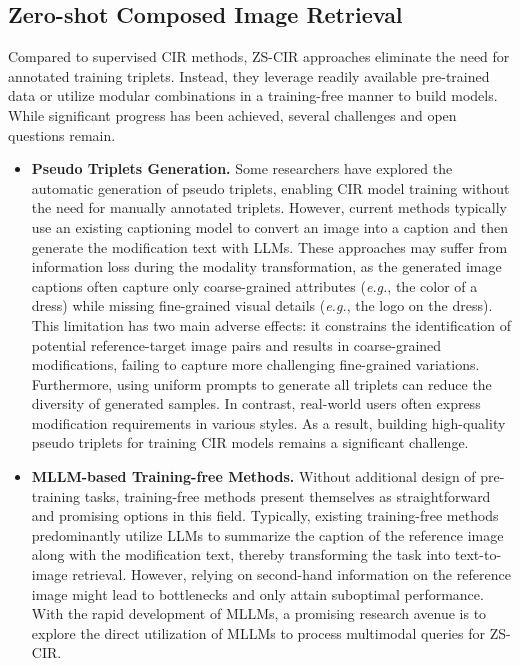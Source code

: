 \subsection{Zero-shot Composed Image Retrieval}
Compared to supervised CIR methods, ZS-CIR approaches eliminate the need for annotated training triplets. Instead, they leverage readily available pre-trained data or utilize modular combinations in a training-free manner to build models. While significant progress has been achieved, several challenges and open questions remain.
\begin{itemize}
    \item \textbf{Pseudo Triplets Generation.}
    Some researchers have explored the automatic generation of pseudo triplets, enabling CIR model training without the need for manually annotated triplets. However, current methods typically use an existing captioning model to convert an image into a caption and then generate the modification text with LLMs. These approaches may suffer from information loss during the modality transformation, as the generated image captions often capture only coarse-grained attributes (\textit{e.g.}, the color of a dress) while missing fine-grained visual details (\textit{e.g.}, the logo on the dress). This limitation has two main adverse effects: it constrains the identification of potential reference-target image pairs and results in coarse-grained modifications, failing to capture more challenging fine-grained variations. Furthermore, using uniform prompts to generate all triplets can reduce the diversity of generated samples. In contrast, real-world users often express modification requirements in various styles. As a result, building high-quality pseudo triplets for training CIR models remains a significant challenge.
 \item \textbf{MLLM-based Training-free Methods.} Without additional design of pre-training tasks, training-free methods present themselves as straightforward and promising options in this field. Typically, existing training-free methods predominantly utilize LLMs to summarize the caption of the reference image along with the modification text, thereby transforming the task into text-to-image retrieval. However, relying on second-hand information on the reference image might lead to bottlenecks and only attain suboptimal performance. With the rapid development of MLLMs, a promising research avenue is to explore the direct utilization of MLLMs to process multimodal queries for ZS-CIR.

\end{itemize}
